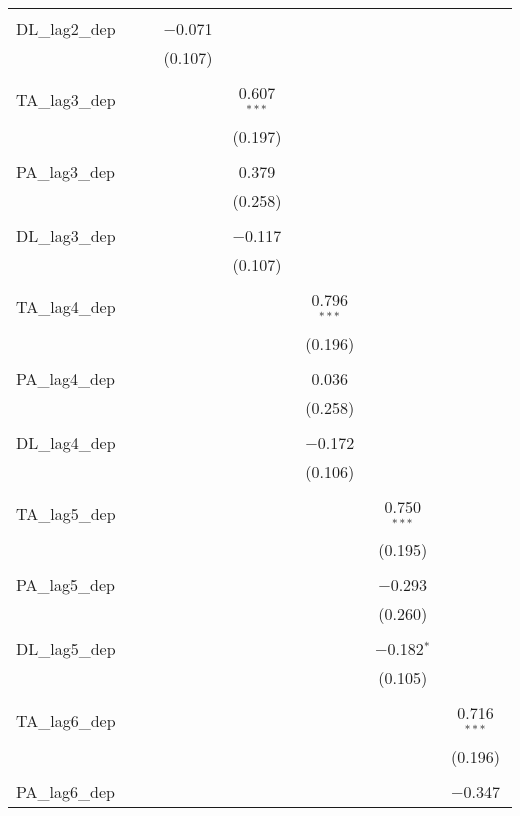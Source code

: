 \begin{table}[!htbp]
\begin{tabular}{@{\extracolsep{5pt}}lccccccc}
  & & & & & & & \\ 
 DL\_lag2\_dep &  &  & $-$0.071 &  &  &  &  \\ 
  &  &  & (0.107) &  &  &  &  \\ 
  & & & & & & & \\ 
 TA\_lag3\_dep &  &  &  & 0.607$^{***}$ &  &  &  \\ 
  &  &  &  & (0.197) &  &  &  \\ 
  & & & & & & & \\ 
 PA\_lag3\_dep &  &  &  & 0.379 &  &  &  \\ 
  &  &  &  & (0.258) &  &  &  \\ 
  & & & & & & & \\ 
 DL\_lag3\_dep &  &  &  & $-$0.117 &  &  &  \\ 
  &  &  &  & (0.107) &  &  &  \\ 
  & & & & & & & \\ 
 TA\_lag4\_dep &  &  &  &  & 0.796$^{***}$ &  &  \\ 
  &  &  &  &  & (0.196) &  &  \\ 
  & & & & & & & \\ 
 PA\_lag4\_dep &  &  &  &  & 0.036 &  &  \\ 
  &  &  &  &  & (0.258) &  &  \\ 
  & & & & & & & \\ 
 DL\_lag4\_dep &  &  &  &  & $-$0.172 &  &  \\ 
  &  &  &  &  & (0.106) &  &  \\ 
  & & & & & & & \\ 
 TA\_lag5\_dep &  &  &  &  &  & 0.750$^{***}$ &  \\ 
  &  &  &  &  &  & (0.195) &  \\ 
  & & & & & & & \\ 
 PA\_lag5\_dep &  &  &  &  &  & $-$0.293 &  \\ 
  &  &  &  &  &  & (0.260) &  \\ 
  & & & & & & & \\ 
 DL\_lag5\_dep &  &  &  &  &  & $-$0.182$^{*}$ &  \\ 
  &  &  &  &  &  & (0.105) &  \\ 
  & & & & & & & \\ 
 TA\_lag6\_dep &  &  &  &  &  &  & 0.716$^{***}$ \\ 
  &  &  &  &  &  &  & (0.196) \\ 
  & & & & & & & \\ 
 PA\_lag6\_dep &  &  &  &  &  &  & $-$0.347 \\ 

\end{tabular}
\end{table}
